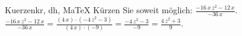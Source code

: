\begin{MAufgabe}{Kuerzen}{kr, dh, MaTeX}
K\"urzen Sie soweit m\"oglich: $\frac{ - 16\, x\, z^2 - 12\, x}{- 36\, x}$.\\ 
\ifLsg\MLoesung
\quad $\frac{ - 16\, x\, z^2 - 12\, x}{- 36\, x}=\frac{(4\, x)\cdot( - 4\, z^2 - 3)}{(4\, x)\cdot(-9)}=\frac{ - 4\, z^2 - 3}{-9}=\frac{4\, z^2 + 3}{9}$.\else\relax\fi
 \end{MAufgabe}